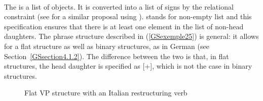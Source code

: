 \vbox{
\ea
\label{GSexemple25}\label{CP-ex-head-complements-phrase}
 \impl \\	
\z
}
\noindent
The \compsl is a list of  objects. It is converted into a list of signs by the
relational constraint  (see \citealt[]{GSag2000a-u} for a similar
proposal using ).  stands for non-empty list and this
specification ensures that there is at least one element in the list of non-head daughters. The
phrase structure described in (\ref{GSexemple25}) is general: it allows for a flat structure as well
as binary structures, as in German (see Section~\ref{GSsection4.1.2}). The difference between the
two is that, in flat structures, the head daughter is specified as \mbox{[\light{}$+$]}, which is
not the case in binary structures.


\begin{figure}
\caption{Flat VP structure with an Italian restructuring verb}
    \label{GSfigure4}
\end{figure}
%

